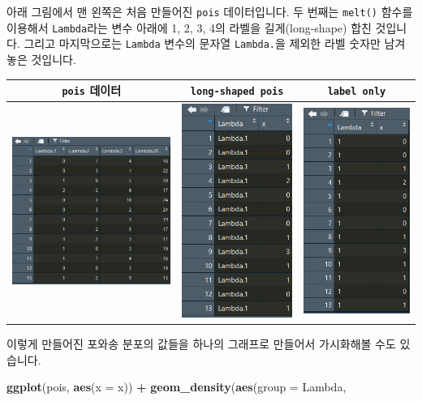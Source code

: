 \documentclass[]{book}
\newenvironment{Shaded}{\begin{snugshade}}{\end{snugshade}}
\newcommand{\DataTypeTok}[1]{\textcolor[rgb]{0.13,0.29,0.53}{#1}}
\newcommand{\KeywordTok}[1]{\textcolor[rgb]{0.13,0.29,0.53}{\textbf{#1}}}
\newcommand{\NormalTok}[1]{#1}
\newcommand{\OperatorTok}[1]{\textcolor[rgb]{0.81,0.36,0.00}{\textbf{#1}}}
\newcommand{\StringTok}[1]{\textcolor[rgb]{0.31,0.60,0.02}{#1}}
\begin{document}
아래 그림에서 맨 왼쪽은 처음 만들어진 \texttt{pois} 데이터입니다. 두 번째는 \texttt{melt()} 함수를 이용해서 \texttt{Lambda}라는 변수 아래에 1, 2, 3, 4의 라벨을 길게(long-shape) 합친 것입니다. 그리고 마지막으로는 \texttt{Lambda} 변수의 문자열 \texttt{Lambda.}을 제외한 라벨 숫자만 남겨놓은 것입니다.

\begin{longtable}[]{@{}ccc@{}}
\toprule
\texttt{pois} 데이터 & \texttt{long-shaped\ pois} & \texttt{label\ only}\tabularnewline
\midrule
\endhead
\includegraphics{r.post/pois1.png} & \includegraphics{r.post/pois2.png} & \includegraphics{r.post/pois3.png}\tabularnewline
\bottomrule
\end{longtable}

이렇게 만들어진 포와송 분포의 값들을 하나의 그래프로 만들어서 가시화해볼 수도 있습니다.

\begin{Shaded}
\begin{Highlighting}[]
\KeywordTok{ggplot}\NormalTok{(pois, }\KeywordTok{aes}\NormalTok{(}\DataTypeTok{x =}\NormalTok{ x)) }\OperatorTok{+}
\StringTok{  }\KeywordTok{geom_density}\NormalTok{(}\KeywordTok{aes}\NormalTok{(}\DataTypeTok{group =}\NormalTok{ Lambda, }
             
\end{Highlighting}
\end{Shaded}
\end{document}
